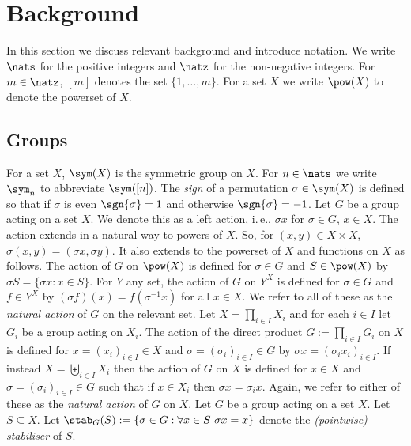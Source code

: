 \documentclass[11pt]{article}
\newcommand{\ie}{i.\,e.}
\begin{document}
\section{Background}\label{sec:background}
In this section we discuss relevant background and introduce notation.
We write $\nats$ for the positive integers and $\natz$ for the non-negative
integers. For $m \in \natz$, $[m]$ denotes the set $\{1, \ldots, m \}$. For a
set $X$ we write $\pow(X)$ to denote the powerset of $X$.
\subsection{Groups}
For a set $X$, $\sym(X)$ is the symmetric group on $X$. For $n \in \nats$ we
write $\sym_n$ to abbreviate $\sym([n])$. The \emph{sign} of a permutation
$\sigma \in \sym(X)$ is defined so that if $\sigma$ is even $\sgn{\sigma} = 1$
and otherwise $\sgn{\sigma} = -1$.
Let $G$ be a group acting on a set $X$. We denote this as a left action, \ie,
$\sigma x$ for $\sigma \in G$, $x \in X$. The action extends in a natural way to
powers of $X$. So, for $(x,y) \in X \times X$, $\sigma(x,y) = (\sigma x,\sigma
y)$. It also extends to the powerset of $X$ and functions on $X$ as follows. The
action of $G$ on $\pow(X)$ is defined for $\sigma \in G$ and $S \in \pow(X)$ by
$\sigma S = \{\sigma x : x \in S\}$. For $Y$ any set, the action of $G$ on $Y^X$
is defined for $\sigma \in G$ and $f\in Y^X$ by $(\sigma f) (x) = f(\sigma^{-1} x)$
for all $x \in X$. We refer to all of these as the \emph{natural action} of $G$
on the relevant set.
Let $X = \prod_{i \in I} X_i$ and for each $i \in I$ let $G_i$ be a group acting
on $X_i$. The action of the direct product $G := \prod_{i \in I}G_i$ on $X$ is
defined for $x = (x_i)_{i \in I} \in X$ and $\sigma = (\sigma_i)_{i \in I} \in
G$ by $\sigma x = (\sigma_i x_i)_{i \in I}$. If instead $X = \biguplus_{i \in
  I}X_i$ then the action of $G$ on $X$ is defined for $x \in X$ and $\sigma =
(\sigma_i)_{i \in I} \in G$ such that if $x \in X_i$ then $\sigma x = \sigma_i
x$. Again, we refer to either of these as the \emph{natural action} of $G$ on
$X$.
Let $G$ be a group acting on a set $X$. Let $S \subseteq X$. Let $\stab_G(S) :=
\{\sigma \in G : \forall x \in S \,\, \sigma x = x\}$ denote the
\emph{(pointwise) stabiliser} of $S$.
\end{document}
